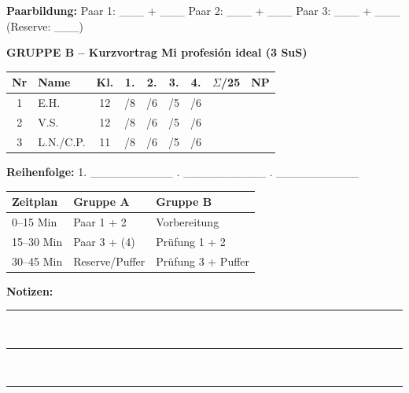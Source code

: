 \documentclass[11pt, a4paper]{article}
\begin{document}
\vspace{0.5cm}

\textbf{Paarbildung:} Paar 1: \_\_\_ + \_\_\_ \quad Paar 2: \_\_\_ + \_\_\_ \quad Paar 3: \_\_\_ + \_\_\_ \quad (Reserve: \_\_\_)

\vspace{0.8cm}

\textbf{\textcolor{gruppeB}{GRUPPE B -- Kurzvortrag \glqq Mi profesión ideal\grqq} (3 SuS)}

\vspace{0.3cm}

\begin{tabular}{|c|l|c|c|c|c|c|c|c|}
\hline
\rowcolor{gruppeB!20}
\textbf{Nr} & \textbf{Name} & \textbf{Kl.} & \textbf{1.} & \textbf{2.} & \textbf{3.} & \textbf{4.} & \textbf{$\Sigma$/25} & \textbf{NP} \\
\hline
1 & E.H. & 12 & /8 & /6 & /5 & /6 & & \\
\hline
2 & V.S. & 12 & /8 & /6 & /5 & /6 & & \\
\hline
3 & L.N./C.P. & 11 & /8 & /6 & /5 & /6 & & \\
\hline
\end{tabular}

\vspace{0.8cm}

\textbf{Reihenfolge:} 1. \_\_\_\_\_\_\_\_\_\_ . \_\_\_\_\_\_\_\_\_\_ . \_\_\_\_\_\_\_\_\_\_

\vspace{1cm}

\begin{center}
\begin{tabular}{|p{4cm}|p{4cm}|p{4cm}|}
\hline
\rowcolor{hellgrau}
\textbf{Zeitplan} & \textbf{Gruppe A} & \textbf{Gruppe B} \\
\hline
0--15 Min & Paar 1 + 2 & Vorbereitung \\
\hline
15--30 Min & Paar 3 + (4) & Prüfung 1 + 2 \\
\hline
30--45 Min & Reserve/Puffer & Prüfung 3 + Puffer \\
\hline
\end{tabular}
\end{center}

\vspace{0.5cm}

\textbf{Notizen:}\\[0.2cm]
\rule{\textwidth}{0.4pt}\\[0.3cm]
\rule{\textwidth}{0.4pt}\\[0.3cm]
\rule{\textwidth}{0.4pt}
\end{document}
